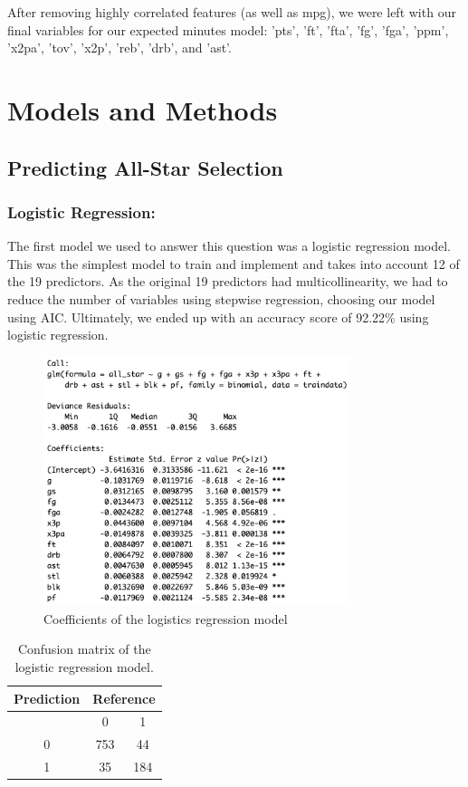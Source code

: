 \documentclass[12pt]{article}
\begin{document}
After removing highly correlated features (as well as mpg), we were left with our final variables for our expected minutes model: 'pts', 'ft', 'fta', 'fg', 'fga', 'ppm', 'x2pa', 'tov', 'x2p', 'reb', 'drb',  and 'ast'.

\section{Models and Methods}
\subsection{Predicting All-Star Selection}
\subsubsection{Logistic Regression:} The first model we used to answer this question was a logistic regression model. This was the simplest model to train and implement and takes into account 12 of the 19 predictors. As the original 19 predictors had multicollinearity, we had to reduce the number of variables using stepwise regression, choosing our model using AIC. Ultimately, we ended up with an accuracy score of 92.22\% using logistic regression. 

\begin{figure}[h]
    \centering
    \includegraphics[width=0.8\textwidth]{MM_AS_FUNCTION_CALL.png}
    \caption{Coefficients of the logistics regression model}
    \label{fig:decision_tree_confusion_matrix}
\end{figure}

\begin{table}[h]
    \centering
    \begin{tabular}{c|cc}
        \toprule
        \textbf{Prediction} & \multicolumn{2}{c}{\textbf{Reference}} \\
        \midrule
        & 0 & 1 \\
        \hline
        0 & 753 & 44 \\
        1 & 35 & 184 \\
        \bottomrule
    \end{tabular}
    \caption{Confusion matrix of the logistic regression model.}
    \label{tab:confusion_matrix}
\end{table}
\end{document}
